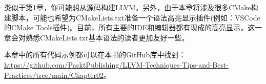 类似于第1章，你可能想从源码构建LLVM。另外，由于本章将涉及很多CMake构建脚本，可能也希望为CMakeLists.txt准备一个语法高亮显示插件(例如：VSCode的CMake Tools插件)。目前，所有主要的IDE和编辑器都有现成的高亮显示。这一章会对熟悉CMakeLists.txt基本语法的读者更加友好一些。

本章中的所有代码示例都可以在本书的GitHub库中找到：\url{https://github.com/PacktPublishing/LLVM-Techniques-Tips-and-Best-Practices/tree/main/Chapter02}。